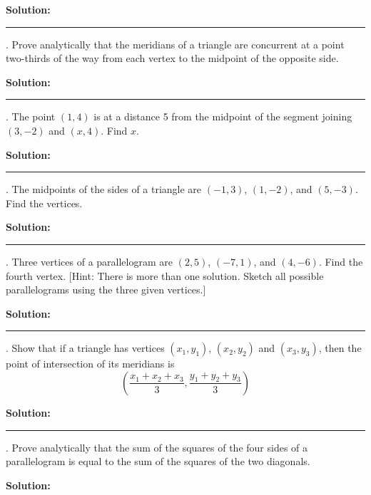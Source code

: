 \documentclass[10pt,letterpaper]{article}
\begin{document}
\medskip
{} {\textbf{{\color{blue}Solution}:}}

\noindent\rule{15cm}{0.4pt}

. Prove analytically that the meridians of a triangle are concurrent at a point two-thirds of the way from each vertex to the midpoint of the opposite side.

\medskip
{} {\textbf{{\color{blue}Solution}:}}

\noindent\rule{15cm}{0.4pt}

. The point $(1,4)$ is at a distance 5 from the midpoint of the segment joining $(3, -2)$ and $(x,4)$. Find $x$.

\medskip
{} {\textbf{{\color{blue}Solution}:}}

\noindent\rule{15cm}{0.4pt}

. The midpoints of the sides of a triangle are $(-1,3)$, $(1,-2)$, and $(5,-3)$. Find the vertices.

\medskip
{} {\textbf{{\color{blue}Solution}:}}

\noindent\rule{15cm}{0.4pt}

. Three vertices of a parallelogram are $(2,5)$, $(-7,1)$, and $(4,-6)$. Find the fourth vertex. [Hint: There is more than one \color{violet}solution\color{black}. Sketch all possible parallelograms using the three given vertices.]

\medskip
{} {\textbf{{\color{blue}Solution}:}}

\noindent\rule{15cm}{0.4pt}

. Show that if a triangle has vertices $(x_1,y_1)$, $(x_2,y_2)$ and $(x_3,y_3)$, then the point of intersection of its meridians is 
\[ \left(\frac{x_1 + x_2 + x_3}{3}, \frac{y_1 + y_2 + y_3}{3}\right) \]

\medskip
{} {\textbf{{\color{blue}Solution}:}}

\noindent\rule{15cm}{0.4pt}

. Prove analytically that the sum of the squares of the four sides of a parallelogram is equal to the sum of the squares of the two diagonals.

\medskip
{} {\textbf{{\color{blue}Solution}:}}
\end{document}
